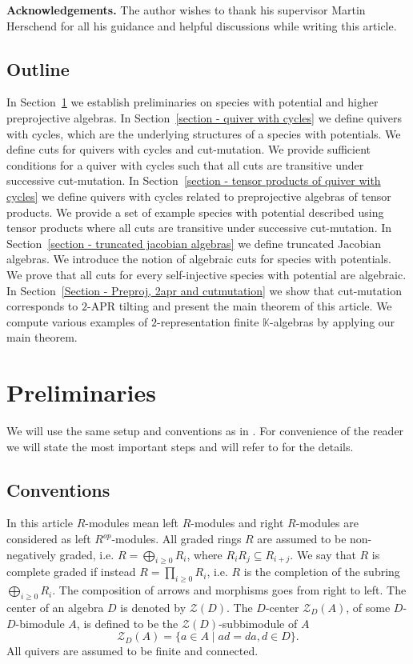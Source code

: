 \documentclass[a4paper, reqno]{amsart}
\theoremstyle{definition}
\newcommand{\K}{\mathbb{K}}
\begin{document}
\noindent\textbf{Acknowledgements.} The author wishes to thank his supervisor Martin Herschend for all his guidance and helpful discussions while writing this article.

\subsection{Outline}
In Section~\ref{Section - prel} we establish preliminaries on species with potential and higher preprojective algebras. In Section~\ref{section - quiver with cycles} we define quivers with cycles, which are the underlying structures of a species with potentials. We define cuts for quivers with cycles and cut-mutation. We provide sufficient conditions for a quiver with cycles such that all cuts are transitive under successive cut-mutation. In Section~\ref{section - tensor products of quiver with cycles} we define quivers with cycles related to preprojective algebras of tensor products. We provide a set of example species with potential described using tensor products where all cuts are transitive under successive cut-mutation. In Section~\ref{section - truncated jacobian algebras} we define truncated Jacobian algebras. We introduce the notion of algebraic cuts for species with potentials. We prove that all cuts for every self-injective species with potential are algebraic. In Section~\ref{Section - Preproj, 2apr and cutmutation} we show that cut-mutation corresponds to $2$-APR tilting and present the main theorem of this article. We compute various examples of $2$-representation finite $\K$-algebras by applying our main theorem.

\section{Preliminaries}\label{Section - prel}
We will use the same setup and conventions as in \cite{soderberg2024mutation}. For convenience of the reader we will state the most important steps and will refer to \cite{soderberg2024mutation} for the details.

\subsection{Conventions}
In this article $R$-modules mean left $R$-modules and right $R$-modules are considered as left $R^{op}$-modules. All graded rings $R$ are assumed to be non-negatively graded, i.e. $R = \bigoplus_{i\ge 0}R_i$, where $R_iR_j \subseteq R_{i+j}$. We say that $R$ is complete graded if instead $R = \prod_{i\ge 0}R_i$, i.e. $R$ is the completion of the subring $\bigoplus_{i\ge 0}R_i$. The composition of arrows and morphisms goes from right to left. The center of an algebra $D$ is denoted by $\mathcal{Z}(D)$. The $D$-center $\mathcal{Z}_D(A)$, of some $D$-$D$-bimodule $A$, is defined to be the $\mathcal{Z}(D)$-subbimodule of $A$
\begin{equation*}
	\mathcal{Z}_D(A) = \{a\in A \mid ad = da, d\in D \}.
\end{equation*}
All quivers are assumed to be finite and connected.
\end{document}
